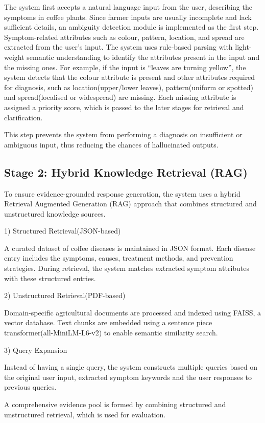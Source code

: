 \documentclass[conference]{IEEEtran}
\begin{document}
The system first accepts a natural language input from the user, describing the symptoms in coffee plants. Since farmer inputs are usually incomplete and lack sufficient details, an ambiguity detection module is implemented as the first step. Symptom-related attributes such as colour, pattern, location, and spread are extracted from the user’s input. The system uses rule-based parsing with light-weight semantic understanding to identify the attributes present in the input and the missing ones. For example, if the input is “leaves are turning yellow”, the system detects that the colour attribute is present and other attributes required for diagnosis, such as location(upper/lower leaves), pattern(uniform or spotted) and spread(localised or widespread) are missing. Each missing attribute is assigned a priority score, which is passed to the later stages for retrieval and clarification.

This step prevents the system from performing a diagnosis on insufficient or ambiguous input, thus reducing the chances of hallucinated outputs.

\subsection{Stage 2: Hybrid Knowledge Retrieval (RAG)}

To ensure evidence-grounded response generation, the system uses a hybrid Retrieval Augmented Generation (RAG) approach that combines structured and unstructured knowledge sources.

1) Structured Retrieval(JSON-based)

A curated dataset of coffee diseases is maintained in JSON format. Each disease entry includes the symptoms, causes, treatment methods, and prevention strategies. During retrieval, the system matches extracted symptom attributes with these structured entries.

2) Unstructured Retrieval(PDF-based)

Domain-specific agricultural documents are processed and indexed using FAISS, a vector database. Text chunks are embedded using a sentence piece transformer(all-MiniLM-L6-v2) to enable semantic similarity search.

3) Query Expansion 

Instead of having a single query, the system constructs multiple queries based on the original user input, extracted symptom keywords and the user responses to previous queries.

A comprehensive evidence pool is formed by combining structured and unstructured retrieval, which is used for evaluation.
\end{document}
